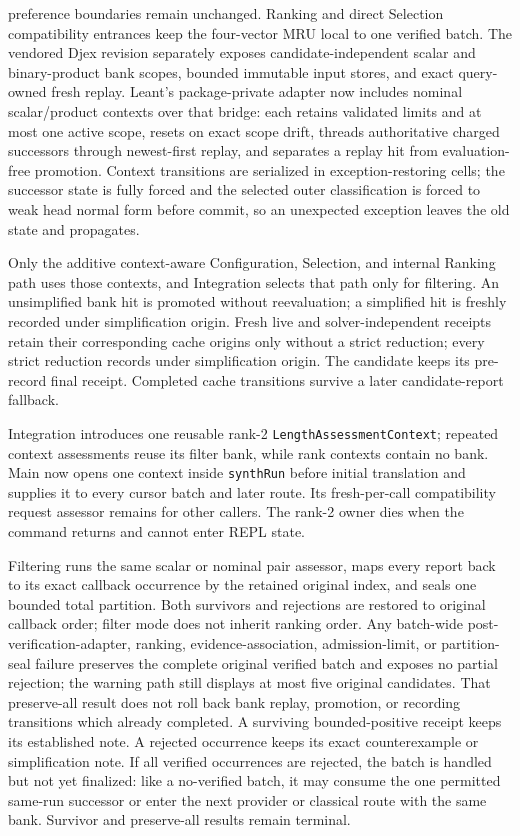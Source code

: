 \documentclass[11pt,oneside]{article}
\newcommand{\code}[1]{\texttt{#1}}
\begin{document}
preference boundaries remain unchanged. Ranking and direct Selection
compatibility entrances keep the four-vector MRU local to one verified batch.
The vendored Djex revision separately exposes candidate-independent scalar and
binary-product bank scopes, bounded immutable input stores, and exact
query-owned fresh replay. Leant's package-private adapter now includes nominal
scalar/product contexts over that bridge: each retains validated limits and at
most one active scope, resets on exact scope drift, threads authoritative
charged successors through newest-first replay, and separates a replay hit
from evaluation-free promotion. Context transitions are serialized in
exception-restoring cells; the successor state is fully forced and the selected
outer classification is forced to weak head normal form before commit, so an
unexpected exception leaves the old state and propagates.

Only the additive context-aware Configuration, Selection, and internal Ranking
path uses those contexts, and Integration selects that path only for filtering.
An unsimplified bank hit is promoted without reevaluation; a simplified hit is
freshly recorded under simplification origin. Fresh live and solver-independent
receipts retain their corresponding cache origins only without a strict
reduction; every strict reduction records under simplification origin. The
candidate keeps its pre-record final receipt. Completed cache transitions survive a later
candidate-report fallback.

Integration introduces one reusable rank-2
\code{LengthAssessmentContext}; repeated context assessments reuse its filter
bank, while rank contexts contain no bank. Main now opens one context inside
\code{synthRun} before initial translation and supplies it to every cursor
batch and later route. Its
fresh-per-call compatibility request assessor remains for other callers. The
rank-2 owner dies when the command returns and cannot enter REPL state.

Filtering runs the same scalar or nominal pair assessor, maps every report
back to its exact callback occurrence by the retained original index, and
seals one bounded total partition. Both survivors and rejections are restored
to original callback order; filter mode does not inherit ranking order. Any
batch-wide post-verification-adapter, ranking, evidence-association,
admission-limit, or partition-seal failure preserves the complete original
verified batch and exposes no partial rejection; the warning path still
displays at most five original candidates. That preserve-all result does not
roll back bank replay, promotion, or recording transitions which already
completed. A
surviving bounded-positive receipt keeps its established note. A rejected
occurrence keeps its exact counterexample or simplification note. If all
verified occurrences are rejected, the batch is handled but not yet finalized:
like a no-verified batch, it may consume the one permitted same-run successor
or enter the next provider or classical route with the same bank. Survivor and
preserve-all results remain terminal.
\end{document}
